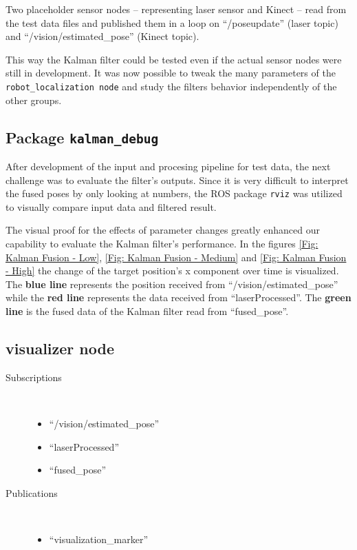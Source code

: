 Two placeholder sensor nodes -- representing laser sensor and Kinect -- read from the test data files and published them in a loop on ``/poseupdate'' (laser topic) and ``/vision/estimated\_pose'' (Kinect topic).

This way the Kalman filter could be tested even if the actual sensor nodes were still in development. It was now possible to tweak the many parameters of the \texttt{robot\_localization node} and study the filters behavior independently of the other groups.

\subsection{Package \texttt{kalman\_debug}}
After development of the input and procesing pipeline for test data, the next challenge was to evaluate the filter's outputs. Since it is very difficult to interpret the fused poses by only looking at numbers, the ROS package \texttt{rviz} was utilized to visually compare input data and filtered result.

The visual proof for the effects of parameter changes greatly enhanced our capability to evaluate the Kalman filter's performance. In the figures \ref{Fig: Kalman Fusion - Low}, \ref{Fig: Kalman Fusion - Medium} and \ref{Fig: Kalman Fusion - High} the change of the target position's x component over time is visualized. The \textbf{blue line} represents the position received from ``/vision/estimated\_pose'' while the \textbf{red line} represents the data received from ``laserProcessed''. The \textbf{green line} is the fused data of the Kalman filter read from ``fused\_pose''.

\subsection{visualizer node}
\begin{description}
\item[Subscriptions]\
	\begin{itemize}
	\item ``/vision/estimated\_pose'' 
	\item ``laserProcessed''
	\item ``fused\_pose''
	\end{itemize}
	
\item[Publications]\
	\begin{itemize}
	\item ``visualization\_marker''
	\end{itemize}
\end{description}


